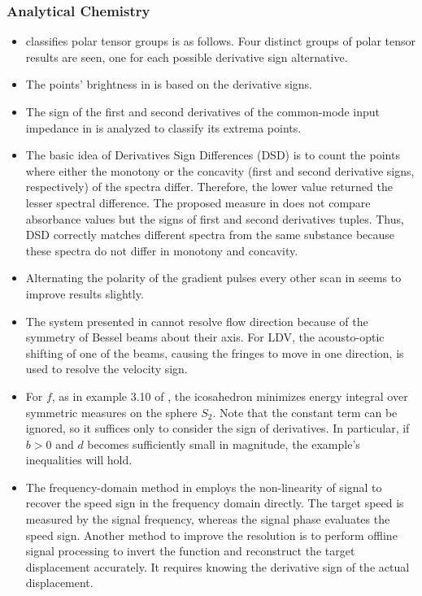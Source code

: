 \documentclass[11pt]{book}
\begin{document}
\subsubsection{Analytical Chemistry}
\begin{itemize}
\item \cite{de2000infrared}
classifies polar tensor groups is as follows. Four distinct groups
of polar tensor results are seen, one for each possible derivative
sign alternative.
\item The points' brightness in \cite{el2002multiple}
is based on the derivative signs.
\item The sign of the first and second derivatives of the common-mode input
impedance in \cite{spinelli2005two}
is analyzed to classify its extrema points.
\item The basic idea of Derivatives Sign Differences (DSD) is to count the
points where either the monotony or the concavity (first and second
derivative signs, respectively) of the spectra differ. Therefore,
the lower value returned the lesser spectral difference. The proposed
measure in \cite{gutierrez2010new}
does not compare absorbance values but the signs of first and second
derivatives tuples. Thus, DSD correctly matches different spectra
from the same substance because these spectra do not differ in monotony
and concavity.
\item Alternating the polarity of the gradient pulses every other scan in
\cite{aguilar2016robust}
seems to improve results slightly.
\item The system presented in \cite{sakah2016measuring}
cannot resolve flow direction because of the symmetry of Bessel beams
about their axis. For LDV, the acousto-optic shifting of one of the
beams, causing the fringes to move in one direction, is used to resolve
the velocity sign.
\item For $f$, as in example 3.10 of \cite{bilyk2019optimal},
the icosahedron minimizes energy integral over symmetric measures
on the sphere $S_{2}$. Note that the constant term can be ignored,
so it suffices only to consider the sign of derivatives. In particular,
if $b>0$ and $d$ becomes sufficiently small in magnitude, the example's
inequalities will hold.
\item The frequency-domain method in \cite{sun2020optimization}
employs the non-linearity of signal to recover the speed sign in the
frequency domain directly. The target speed is measured by the signal
frequency, whereas the signal phase evaluates the speed sign. Another
method to improve the resolution is to perform offline signal processing
to invert the function and reconstruct the target displacement accurately.
It requires knowing the derivative sign of the actual displacement.
\end{itemize}
\end{document}
